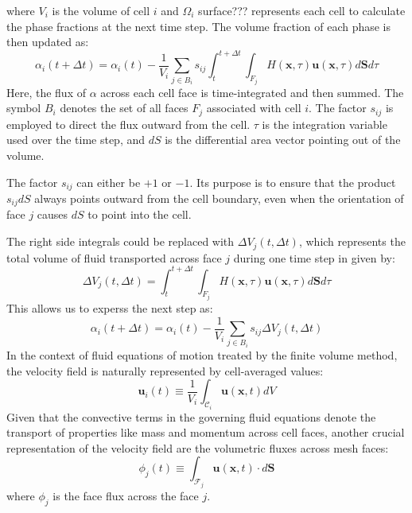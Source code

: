 where $V_i$ is the volume of cell $i$ and $\Omega_i$ surface??? represents each cell to calculate the phase fractions at the next time step. The volume fraction of each phase is then updated as: 
\begin{equation}\label{isoAd-2_}
    \alpha_{i}(t+\Delta t)=\alpha_{i}(t)-\frac{1}{V_{i}} \sum_{j \in B_{i}} s_{i j} \int_{t}^{t+\Delta t} \int_{F_{j}} H(\boldsymbol{x}, \tau) \boldsymbol{u}(\boldsymbol{x}, \tau) d \boldsymbol{S} d \tau
\end{equation}
Here, the flux of $\alpha$ across each cell face is time-integrated and then summed. The symbol $B_i$ denotes the set of all faces $F_j$ associated with cell $i$. The factor $s_{ij}$ is employed to direct the flux outward from the cell. $\tau$ is the integration variable used over the time step, and $dS$ is the differential area vector pointing out of the volume.

The factor $s_{ij}$ can either be $+1$ or $-1$. Its purpose is to ensure that the product $s_{ij}dS$ always points outward from the cell boundary, even when the orientation of face $j$ causes $dS$ to point into the cell.

The right side integrals could be replaced with $\Delta V_j(t,\Delta t)$, which represents the total volume of fluid transported across face $j$ during one time step in given by:
\begin{equation}\label{isoAd-1}
    \Delta V_{j}(t, \Delta t)=\int_{t}^{t+\Delta t} \int_{F_{j}} H(\boldsymbol{x}, \tau) \boldsymbol{u}(\boldsymbol{x}, \tau) d \boldsymbol{S} d \tau
\end{equation}
This allows us to experss the next step as: 
\begin{equation}
\alpha_{i}(t+\Delta t)=\alpha_{i}(t)-\frac{1}{V_{i}} \sum_{j \in B_{i}} s_{i j} \Delta V_{j}(t, \Delta t)
\end{equation}
In the context of fluid equations of motion treated by the finite volume method, the velocity field is naturally represented by cell-averaged values:
\begin{equation}
\mathbf{u}_{i}(t) \equiv \frac{1}{V_{i}} \int_{\mathcal{C}_{i}} \mathbf{u}(\mathbf{x}, t) d V
\end{equation}
Given that the convective terms in the governing fluid equations denote the transport of properties like mass and momentum across cell faces, another crucial representation of the velocity field are the volumetric fluxes across mesh faces:
\begin{equation}\label{isoAd-3}
\phi_{j}(t) \equiv \int_{\mathcal{F}_{j}} \mathbf{u}(\mathbf{x}, t) \cdot d \mathbf{S}
\end{equation}
where $\phi_{j}$ is the face flux across the face $j$.
